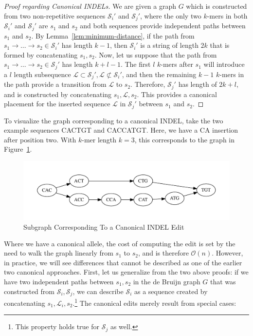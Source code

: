 \documentclass[phd]{ucbthesis}
\begin{document}
\begin{proof}[Proof regarding Canonical INDELs]
\label{proof:canonical-indels}
We are given a graph $G$ which is constructed from two non-repetitive sequences $\mathcal{S}_i'$ and
$\mathcal{S}_j'$, where the only two $k$-mers in both $\mathcal{S}_i'$ and $\mathcal{S}_j'$ are $s_1$
and $s_2$ and both sequences provide independent paths between $s_1$ and $s_2$. By
Lemma~\ref{lem:minimum-distance}, if the path from $s_1 \rightarrow \dots \rightarrow s_2 \in
\mathcal{S}_i'$ has length $k - 1$, then $\mathcal{S}_i'$ is a string of length $2k$ that is formed by
concatenating $s_1, s_2$. Now, let us suppose that the path from $s_1 \rightarrow \dots \rightarrow s_2
\in \mathcal{S}_j'$ has length $k + l - 1$. The first $l$ $k$-mers after $s_1$ will introduce a $l$ length
subsequence $\mathcal{L} \subset \mathcal{S}_j', \mathcal{L} \not\subset \mathcal{S}_i'$, and then the
remaining $k - 1$ $k$-mers in the path provide a transition from $\mathcal{L}$ to $s_2$. Therefore,
$\mathcal{S}_j'$ has length of $2k + l$, and is constructed by concatenating $s_1, \mathcal{L}, s_2$.
This provides a canonical placement for the inserted sequence $\mathcal{L}$ in $\mathcal{S}_j'$ between
$s_1$ and $s_2$.
\end{proof}

To visualize the graph corresponding to a canonical INDEL, take the two example sequences
\textsc{CACTGT} and \textsc{CACCATGT}. Here, we have a \textsc{CA} insertion after position two. With
$k$-mer length $k = 3$, this corresponds to the graph in Figure~\ref{fig:indel}.

\begin{figure}[h]
\begin{center}
\includegraphics[width=0.95\linewidth, clip=true, trim=0 39 0 39]{graphs/indel.pdf}
\end{center}
\caption{Subgraph Corresponding To a Canonical INDEL Edit}
\label{fig:indel}
\end{figure}

Where we have a canonical allele, the cost of computing the edit is set by the need to walk the graph
linearly from $s_1$ to $s_2$, and is therefore $\mathcal{O}(n)$. However, in practice, we will see
differences that cannot be described as one of the earlier two canonical approaches. First, let us
generalize from the two above proofs: if we have two independent paths between $s_1, s_2$ in the
de Bruijn graph $G$ that was constructed from $\mathcal{S}_i, \mathcal{S}_j$, we can describe
$\mathcal{S}_i$ as a sequence created by concatenating $s_1, \mathcal{L}_i, s_2$.\footnote{This
property holds true for $\mathcal{S}_j$ as well.} The canonical edits merely result from special cases:
\end{document}
